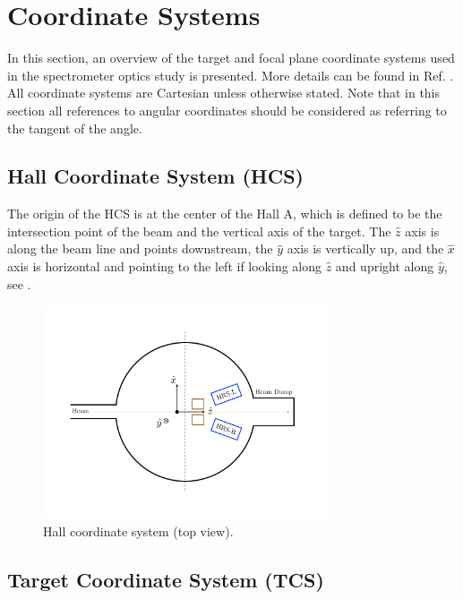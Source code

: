 \section{Coordinate Systems}
\label{C6S1}

In this section, an overview of the target and focal plane coordinate systems used in the spectrometer optics study is presented. More details can be found in Ref. \cite{Liyanage2002}. All coordinate systems are Cartesian unless otherwise stated. Note that in this section all references to angular coordinates should be considered as referring to the tangent of the angle.

\subsection[Hall Coordinate System]{Hall Coordinate System (HCS)}
\label{C6S1SS1}

The origin of the HCS is at the center of the Hall A, which is defined to be the intersection point of the beam and the vertical axis of the target. The $\hat{z}$ axis is along the beam line and points downstream, the $\hat{y}$ axis is vertically up, and the $\hat{x}$ axis is horizontal and pointing to the left if looking along $\hat{z}$ and upright along $\hat{y}$, see .

\begin{figure}[p!]
  \centering
  \includegraphics[width=0.75\textwidth]{figs/HCS.pdf}
  \caption[Hall coordinate system.]{Hall coordinate system (top view). \label{C6S1SS1F1}}
\end{figure}

\subsection[Target Coordinate System]{Target Coordinate System (TCS)}
\label{C6S1SS2}

